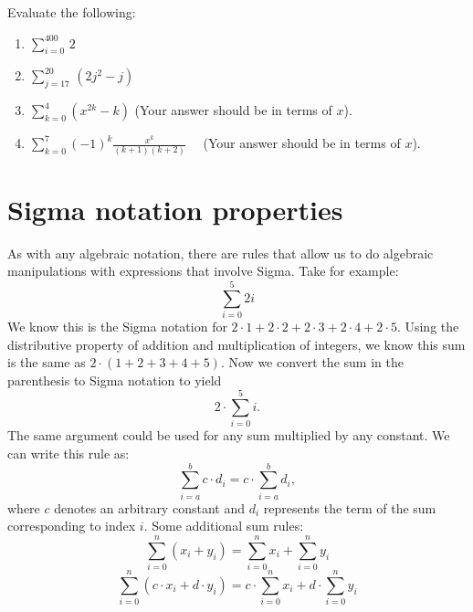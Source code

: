 \begin{exercise}\label{exercise:Sigma:Sigma Notation Practice}
Evaluate the following:
\begin {enumerate}[(1)]
\item
$\sum _{i=0}^{400} \,2$
\item
$\sum_{j=17}^{20} \, \left(2j^2 - j \right)$
\item
$\sum_{k=0}^{4}(x^{2k} - k) $ (Your answer should be in terms of $x$).
\item
$\sum_{k=0}^{7} (-1)^k\frac{x^{k}}{(k+1)(k+2)}$ ~~(Your answer should be in terms of $x$).
\end {enumerate}
\end{exercise}

\section{Sigma notation properties}

As with any algebraic notation, there are rules that allow us to do algebraic manipulations with expressions that involve Sigma. 
Take for example:
\[\sum_{i=0}^{5}2i\]
We know this is the Sigma notation for $2\cdot1+2\cdot2+2\cdot3+2\cdot4+2\cdot5$. Using the distributive property of addition and multiplication of integers, we know this sum is the same as $2\cdot(1+2+3+4+5)$.  Now we convert the sum in the parenthesis to Sigma notation to yield
\[2\cdot\sum_{i=0}^{5}i.\]
The same argument could be used for any sum  multiplied by any constant. We can write this rule as:
\[\sum_{i=a}^{b} c \cdot d_i = c \cdot \sum_{i=a}^{b}  d_i,\]
where $c$ denotes an arbitrary constant and $d_i$ represents the term of the sum corresponding to index $i$.
Some additional sum rules:
\[ \sum_{i=0}^n \left(x_i +y_i \right) = \sum_{i=0}^n x_i + \sum_{i=0}^n y_i \]
\[ \sum_{i=0}^n \left(c \cdot x_i + d \cdot y_i \right) = c \cdot \sum_{i=0}^n x_i + d \cdot \sum_{i=0}^n y_i \]

